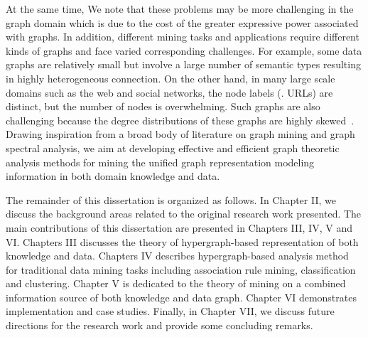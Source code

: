 \begin{enumerate}
    At the same time, We note that these problems may be more challenging in the graph domain which is due to the cost of the greater expressive power associated with graphs. In addition, different mining tasks and applications require different kinds of graphs and face varied corresponding challenges. For example, some data graphs are relatively small but involve a large number of semantic types resulting in highly heterogeneous connection. On the other hand, in many large scale domains such as the web and social networks, the node labels (\eg. URLs) are distinct, but the number of nodes is overwhelming. Such graphs are also challenging because the degree distributions of these graphs are highly skewed~\cite{Faloutsos1999}. Drawing inspiration from a broad body of literature on graph mining and graph spectral analysis, we aim at developing effective and efficient graph theoretic analysis methods for mining the unified graph representation modeling information in both domain knowledge and data.

\end{enumerate}

The remainder of this dissertation is organized as follows. In Chapter II, we discuss the background areas related to the original research work presented. The main contributions of this dissertation are presented in Chapters III, IV, V and VI. Chapters III discusses the theory of hypergraph-based representation of both knowledge and data. Chapters IV describes hypergraph-based analysis method for traditional data mining tasks including association rule mining, classification and clustering. Chapter V is dedicated to the theory of mining on a combined information source of both knowledge and data graph. Chapter VI demonstrates implementation and case studies. Finally, in Chapter VII, we discuss future directions for the research work and provide some concluding remarks.






